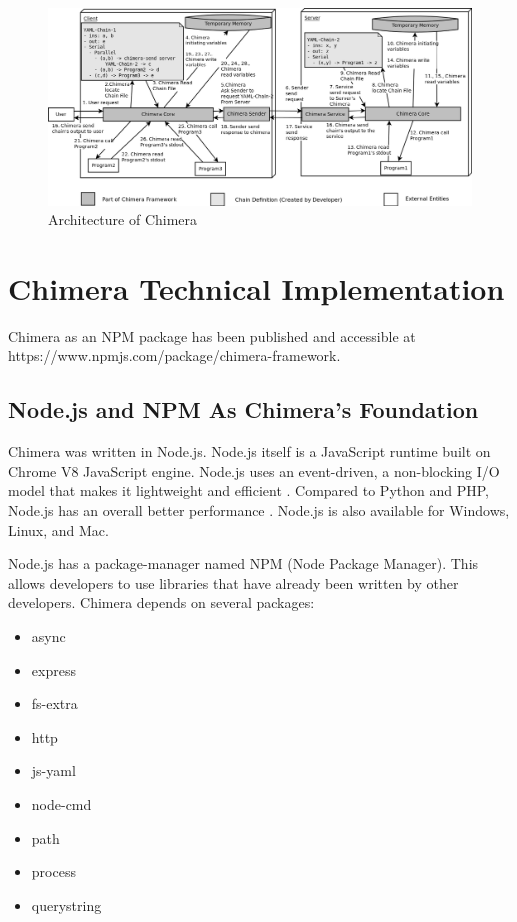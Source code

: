 \documentclass[conference]{IEEEtran}
\begin{document}
\begin{figure}
	\centering
	\includegraphics[width=1.0\textwidth]
		{images/chimera.png}
	\caption{Architecture of Chimera}
	\label{fig:chimeraArchitecture}
\end{figure}

\section{Chimera Technical Implementation}

Chimera as an NPM package has been published and accessible at 
https://www.npmjs.com/package/chimera-framework.


\subsection{Node.js and NPM As Chimera's Foundation}

Chimera was written in Node.js. Node.js itself is a JavaScript runtime built on Chrome 
V8 JavaScript engine. Node.js uses an event-driven, a non-blocking I/O model that makes it 
lightweight and efficient \cite{nodejs}. Compared to Python and PHP, Node.js has an 
overall better performance \cite{lei2014performance}. Node.js is also available for
Windows, Linux, and Mac.

Node.js has a package-manager named NPM (Node Package Manager). This allows developers
to use libraries that have already been written by other developers. Chimera depends on 
several packages:

\begin{itemize}
    \item async
    \item express
    \item fs-extra
    \item http
    \item js-yaml
    \item node-cmd
    \item path
    \item process
    \item querystring
\end{itemize}
\end{document}
